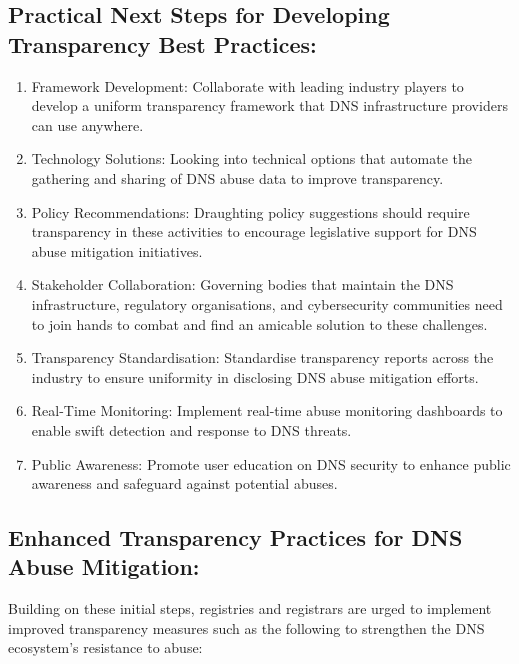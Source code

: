 \subsection{Practical Next Steps for Developing Transparency Best Practices: }

\begin{enumerate}
    \item Framework Development: Collaborate with leading industry players to develop a uniform transparency framework that DNS infrastructure providers can use anywhere.

    \item Technology Solutions: Looking into technical options that automate the gathering and sharing of DNS abuse data to improve transparency.

    \item Policy Recommendations: Draughting policy suggestions should require transparency in these activities to encourage legislative support for DNS abuse mitigation initiatives.
    
    \item Stakeholder Collaboration: Governing bodies that maintain the DNS infrastructure, regulatory organisations, and cybersecurity communities need to join hands to combat and find an amicable solution to these challenges.
    
    \item Transparency Standardisation: Standardise transparency reports across the industry to ensure uniformity in disclosing DNS abuse mitigation efforts.
    \item Real-Time Monitoring: Implement real-time abuse monitoring dashboards to enable swift detection and response to DNS threats.
    \item  Public Awareness: Promote user education on DNS security to enhance public awareness and safeguard against potential abuses.
\end{enumerate}


\subsection{Enhanced Transparency Practices for DNS Abuse Mitigation: }

Building on these initial steps, registries and registrars are urged to implement improved transparency measures such as the following to strengthen the DNS ecosystem's resistance to abuse:

